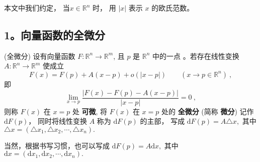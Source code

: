 

本文中我们约定， 当$x\in \mathbb{R}^n$ 时， 用 $|x|$ 表示 $x$ 的欧氏范数。 

\subsection{1。向量函数的全微分}
\begin{definition}{(全微分)}
设有向量函数 $F:\mathbb{R}^{n}\rightarrow\mathbb{R}^{m}$, 且 $p$ 是 $\mathbb{R}^n$ 中的一点 。若存在线性变换 $A:\mathbb{R}^{n}\rightarrow\mathbb{R}^{m}$
使成立
\begin{equation}\label{eq_vecdif_1}
F(x)=F(p)+A(x-p)+o(| x-p| )\quad\quad(x\rightarrow p\in\mathbb{R}^{n})~,
\end{equation}
即
\[
{\displaystyle \lim_{x\rightarrow p}{\displaystyle \frac{|F(x)-F(p)-A(x-p)|}{| x-p| }=0~,}}
\]
则称 $F(x)$ 在 $x=p$ 处 \textbf{可微}, 将 $F(x)$ 在 $x=p$ 处的 \textbf{全微分} (简称 \textbf{微分}) 记作  $\mathrm{d}F(p)$， 同时将线性变换 $A$ 称为 $\mathrm{d}F(p)$ 的主部， 写成  $\mathrm{d}F(p)=A \triangle x,$ 其中 $\triangle x=(\triangle x_1,\triangle x_2,\cdots,\triangle x_n).$ 

当然，根据书写习惯，也可以写成  $\mathrm{d}F(p)=A\mathrm{d}x,$ 其中 $\mathrm{d}x=(\mathrm{d}x_1,\mathrm{d}x_2,\cdots,\mathrm{d}x_n).$ 
\end{definition}

